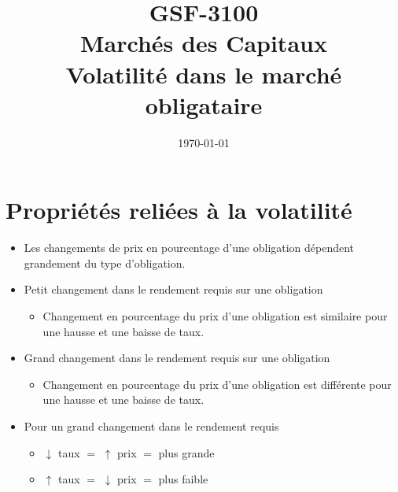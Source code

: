 \documentclass[12pt]{article}
\begin{document}
\begin{titlepage}
\title{GSF-3100 \\ Marchés des Capitaux \\ Volatilité dans le marché obligataire}
\date{\today}
\maketitle

\setcounter{page}{0}
\thispagestyle{empty}
\end{titlepage}
\pagebreak \newpage

\tableofcontents
\pagebreak \newpage
\section{Propriétés reliées à la volatilité}
\begin{itemize}
\item Les changements de prix en pourcentage d'une obligation dépendent grandement du type d'obligation. 
\item Petit changement dans le rendement requis sur une obligation 
\begin{itemize}
\item Changement en pourcentage du prix d'une obligation est similaire pour une hausse et une baisse de taux.
\end{itemize}
\item Grand changement dans le rendement requis sur une obligation 
\begin{itemize}
\item Changement en pourcentage du prix d'une obligation est différente pour une hausse et une baisse de taux.
\end{itemize}
\item Pour un grand changement dans le rendement requis 
\begin{itemize}
\item $\downarrow$ taux $=$ $\uparrow$ prix $=$ plus grande
\item $\uparrow$ taux $=$ $\downarrow$ prix $=$ plus faible
\end{itemize}
\end{itemize}
\end{document}
